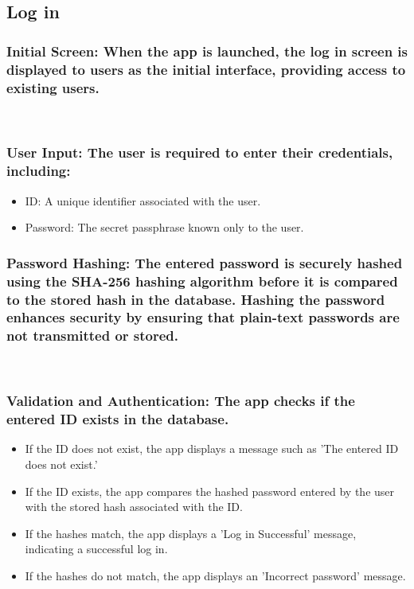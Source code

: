 \documentclass[conference]{IEEEtran}
\begin{document}
\subsection{Log in}

\subsubsection{Initial Screen: When the app is launched, the log in screen is displayed to users as the initial interface, providing access to existing users.}

\
\subsubsection{User Input: The user is required to enter their credentials, including:}
\begin{itemize}
    \item ID: A unique identifier associated with the user. \\
    \item Password: The secret passphrase known only to the user. \\
\end{itemize}

\subsubsection{Password Hashing: The entered password is securely hashed using the SHA-256 hashing algorithm before it is compared to the stored hash in the database. Hashing the password enhances security by ensuring that plain-text passwords are not transmitted or stored.}

\
\subsubsection{Validation and Authentication: The app checks if the entered ID exists in the database.}
\begin{itemize}
    \item If the ID does not exist, the app displays a message such as 'The entered ID does not exist.' \\
    \item If the ID exists, the app compares the hashed password entered by the user with the stored hash associated with the ID. \\
    \item If the hashes match, the app displays a 'Log in Successful' message, indicating a successful log in. \\
    \item If the hashes do not match, the app displays an 'Incorrect password' message.\\
\end{itemize}
\end{document}
